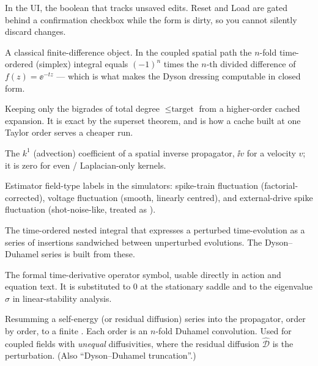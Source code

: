 \begin{description}[leftmargin=0pt,style=nextline]
  \item[Dirty flag / dirty guard] In the UI, the boolean  that tracks
        unsaved edits. Reset and Load are gated behind a confirmation checkbox while
        the form is dirty, so you cannot silently discard changes.

  \item[{Divided difference $f[x_0,\dots,x_n]$}] A classical finite-difference object.
        In the coupled spatial path the $n$-fold time-ordered (simplex) integral
        equals $(-1)^{n}$ times the $n$-th divided difference of
        $f(z)=\ee^{-tz}$ --- which is what makes the Dyson dressing computable in
        closed form.

  \item[Downgrade (filter)] Keeping only the bigrades of total degree
        $\le \text{target}$ from a higher-order cached expansion. It is exact by the
        superset theorem, and is how a cache built at one Taylor order serves a
        cheaper run.

  \item[Drift $V$] The $k^{1}$ (advection) coefficient of a spatial inverse
        propagator, $\ii v$ for a velocity $v$; it is zero for even / Laplacian-only
        kernels.

  \item[\code{'dn'} / \code{'dv'} / \code{'dm'}] Estimator field-type labels in the
        simulators: spike-train fluctuation (factorial-corrected),
        voltage fluctuation (smooth, linearly centred), and external-drive spike
        fluctuation (shot-noise-like, treated as ).

  \item[Duhamel convolution] The time-ordered nested integral that expresses a
        perturbed time-evolution as a series of insertions sandwiched between
        unperturbed evolutions. The Dyson--Duhamel series is built from these.

  \item[\code{Dt}] The formal time-derivative operator symbol, usable directly in
        action and equation text. It is substituted to $0$ at the stationary saddle
        and to the eigenvalue $\sigma$ in linear-stability analysis.

  \item[Dyson dressing / Dyson--Duhamel series] Resumming a self-energy (or residual
        diffusion) series into the propagator, order by order, to a finite
        . Each order is an $n$-fold Duhamel convolution. Used for
        coupled fields with \emph{unequal} diffusivities, where the residual
        diffusion $\hat{\mathcal{D}}$ is the perturbation. (Also ``Dyson--Duhamel
        truncation''.)

\end{description}

